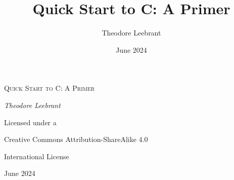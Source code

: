 \documentclass[oneside]{book}
\title{Quick Start to C: A Primer}
\author{Theodore Leebrant}
\date{June 2024}
\theoremstyle{definition}
\begin{document}
\begin{titlepage}
	\centering
	{\Huge \textsc{Quick Start to C: A Primer}\par}
	\vspace{1.5cm}
	{\large \itshape Theodore Leebrant\par}
	\vfill
	{\Large Licensed under a\par
	Creative Commons Attribution-ShareAlike 4.0\par
    International License}

	\vfill


	{\large June 2024\par}
\end{titlepage}


\setlength{\parskip}{12pt}





\pagebreak




\end{document}
